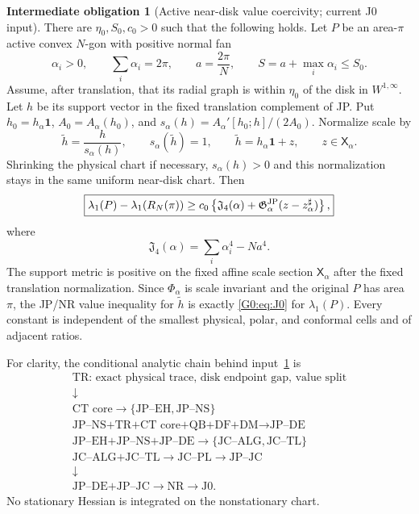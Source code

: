 \documentclass[11pt]{amsart}
\numberwithin{equation}{section}
\theoremstyle{definition}
\newtheorem{obligation}[theorem]{Intermediate obligation}
\theoremstyle{remark}
\newcommand{\Jfour}{\mathfrak J_4}
\newcommand{\Gjp}{\mathfrak G^{\rm JP}}
\begin{document}
\begin{obligation}[Active near-disk value coercivity; current J0 input]
\label{G0:thm:J0}
There are $\eta_0,S_0,c_0>0$ such that the following holds.  Let $P$ be an
area-$\pi$ active convex $N$-gon with positive normal fan
\begin{equation*}
 \alpha_i>0,\qquad \sum_i\alpha_i=2\pi,\qquad
 a=\frac{2\pi}{N},\qquad S=a+\max_i\alpha_i\le S_0.
\end{equation*}
Assume, after translation, that its radial graph is within $\eta_0$ of
the disk in $W^{1,\infty}$.  Let $h$ be its support vector in the fixed
translation complement of JP.  Put $h_0=h_\alpha\mathbf1$,
$A_0=A_\alpha(h_0)$, and
\(
s_\alpha(h)=A_\alpha'[h_0;h]/(2A_0).
\)
Normalize scale by
\[
 \widetilde h=\frac{h}{s_\alpha(h)},
 \qquad s_\alpha(\widetilde h)=1,
 \qquad \widetilde h=h_\alpha\mathbf1+z,
 \qquad z\in\mathsf X_\alpha.
\]
Shrinking the physical chart if necessary, $s_\alpha(h)>0$ and this
normalization stays in the same uniform near-disk chart.  Then
\begin{equation}\label{G0:eq:J0}
 \boxed{
 \lambda_1(P)-\lambda_1(R_N(\pi))
 \ge c_0\left\{
 \Jfour(\alpha)
 +\Gjp_\alpha(z-z_\alpha^\sharp)\right\},}
\end{equation}
where
\begin{equation}\label{G0:eq:J4}
 \Jfour(\alpha)=\sum_i\alpha_i^4-Na^4.
\end{equation}
The support metric is positive on the fixed affine scale section
$\mathsf X_\alpha$ after the fixed translation normalization.  Since
$\Phi_\alpha$ is scale invariant and the original $P$ has area $\pi$,
the JP/NR value inequality for $\widetilde h$ is exactly
\eqref{G0:eq:J0} for $\lambda_1(P)$.
Every constant is independent of the smallest physical, polar, and
conformal cells and of adjacent ratios.
\end{obligation}

For clarity, the conditional analytic chain behind input~\ref{G0:thm:J0} is
\begin{equation}\label{G0:eq:analytic-chain}
 \begin{gathered}
 \text{TR: exact physical trace, disk endpoint gap, value split}\\
 \downarrow\\
 \text{CT core}\longrightarrow\{\text{JP--EH},\text{JP--NS}\}\\
 \text{JP--NS+TR+CT core+QB+DF+DM}\longrightarrow\text{JP--DE}\\
 \text{JP--EH+JP--NS+JP--DE}\longrightarrow
 \{\text{JC--ALG},\text{JC--TL}\}\\
 \text{JC--ALG+JC--TL}\longrightarrow\text{JC--PL}
 \longrightarrow\text{JP--JC}\\
 \downarrow\\
 \text{JP--DE+JP--JC}\longrightarrow\text{NR}\longrightarrow\text{J0}.
 \end{gathered}
\end{equation}
No stationary Hessian is integrated on the nonstationary chart.
\end{document}
